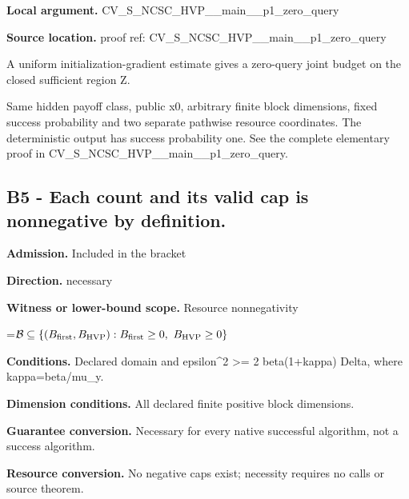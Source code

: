 \documentclass[10pt,a4paper]{article}
\newcommand{\AtlasMath}[1]{\par\begingroup\centering\setbox0=\hbox{$\displaystyle #1$}\ifdim\wd0>1.4\linewidth\typeout{ATLAS WIDE FORMULA: \the\wd0}\fi\ifdim\wd0>\linewidth\resizebox{\linewidth}{!}{\box0}\else\box0\fi\par\endgroup}
\begin{document}
\textbf{Local argument.} CV\_\allowbreak{}S\_\allowbreak{}NCSC\_\allowbreak{}HVP\_\allowbreak{}\_\allowbreak{}main\_\allowbreak{}\_\allowbreak{}p1\_\allowbreak{}zero\_\allowbreak{}query

\textbf{Source location.}  proof ref: CV\_\allowbreak{}S\_\allowbreak{}NCSC\_\allowbreak{}HVP\_\allowbreak{}\_\allowbreak{}main\_\allowbreak{}\_\allowbreak{}p1\_\allowbreak{}zero\_\allowbreak{}query

A uniform initialization-gradient estimate gives a zero-query joint budget on the closed sufficient region Z.

Same hidden payoff class, public x0, arbitrary finite block dimensions, fixed success probability and two separate pathwise resource coordinates. The deterministic output has success probability one. See the complete elementary proof in CV\_\allowbreak{}S\_\allowbreak{}NCSC\_\allowbreak{}HVP\_\allowbreak{}\_\allowbreak{}main\_\allowbreak{}\_\allowbreak{}p1\_\allowbreak{}zero\_\allowbreak{}query.

\subsection{B5 - Each count and its valid cap is nonnegative by definition.}
\textbf{Admission.} Included in the bracket

\textbf{Direction.} necessary

\textbf{Witness or lower-bound scope.} Resource nonnegativity

\AtlasMath{\mathcal B\subseteq\{(B_{\rm first},B_{\rm HVP}):B_{\rm first}\ge0,\ B_{\rm HVP}\ge0\}}
\textbf{Conditions.} Declared domain and epsilon\textasciicircum{}2 >= 2 beta(1+kappa) Delta, where kappa=beta/mu\_\allowbreak{}y.

\textbf{Dimension conditions.} All declared finite positive block dimensions.

\textbf{Guarantee conversion.} Necessary for every native successful algorithm, not a success algorithm.

\textbf{Resource conversion.} No negative caps exist; necessity requires no calls or source theorem.
\end{document}
